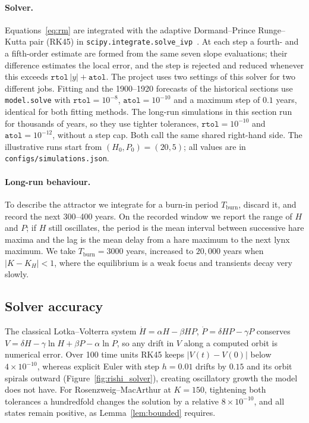 \paragraph{Solver.} Equations~\eqref{eq:rm} are integrated with the adaptive Dormand--Prince
Runge--Kutta pair (RK45) in \texttt{scipy.integrate.solve\_ivp}~\cite{dormand1980,scipysolve}.
At each step a fourth- and a fifth-order estimate are formed from the same seven slope
evaluations; their difference estimates the local error, and the step is rejected and reduced
whenever this exceeds $\texttt{rtol}\,|y|+\texttt{atol}$. The project uses two settings of this
solver for two different jobs. Fitting and the 1900--1920 forecasts of the historical sections use
\texttt{model.solve} with $\texttt{rtol}=10^{-8}$, $\texttt{atol}=10^{-10}$ and a maximum step of
$0.1$ years, identical for both fitting methods. The long-run simulations in this section run for
thousands of years, so they use tighter tolerances, $\texttt{rtol}=10^{-10}$ and
$\texttt{atol}=10^{-12}$, without a step cap. Both call the same shared right-hand side. The
illustrative runs start from $(H_0,P_0)=(20,5)$; all values are in
\texttt{configs/simulations.json}.

\paragraph{Long-run behaviour.} To describe the attractor we integrate for a burn-in period
$T_{\mathrm{burn}}$, discard it, and record the next 300--400 years. On the recorded window we
report the range of $H$ and $P$; if $H$ still oscillates, the period is the mean interval between
successive hare maxima and the lag is the mean delay from a hare maximum to the next lynx
maximum. We take $T_{\mathrm{burn}}=3000$ years, increased to $20{,}000$ years when
$|K-K_H|<1$, where the equilibrium is a weak focus and transients decay very slowly.

\subsection{Solver accuracy}

The classical Lotka--Volterra system $\dot H=\alpha H-\beta HP$, $\dot P=\delta HP-\gamma P$
conserves $V=\delta H-\gamma\ln H+\beta P-\alpha\ln P$, so any drift in $V$ along a computed
orbit is numerical error. Over 100 time units RK45 keeps $|V(t)-V(0)|$ below $4\times10^{-10}$,
whereas explicit Euler with step $h=0.01$ drifts by $0.15$ and its orbit spirals outward
(Figure~\ref{fig:rishi_solver}), creating oscillatory growth the model does not have. For
Rosenzweig--MacArthur at $K=150$, tightening both tolerances a hundredfold changes the
solution by a relative $8\times10^{-10}$, and all states remain positive, as Lemma~\ref{lem:bounded}
requires.

